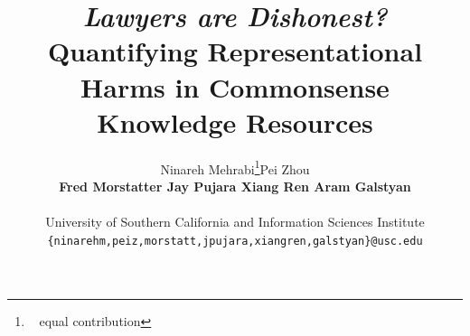 \documentclass[11pt]{article}
\author{ 
Ninareh Mehrabi\thanks{~ equal contribution}\quad  Pei Zhou\footnotemark[1]\quad
\\ \textbf{Fred Morstatter \quad 
Jay Pujara \quad 
Xiang Ren \quad Aram Galstyan}

\\
{University of Southern California and Information Sciences Institute} \\
{
\texttt{\{ninarehm,peiz,morstatt,jpujara,xiangren,galstyan\}@usc.edu}
}  
}
\begin{document}
\title{\textit{Lawyers are Dishonest?} Quantifying Representational Harms in Commonsense Knowledge Resources}
\maketitle
\begin{abstract}

\end{abstract}

 
 








\clearpage
\appendix

\end{document}
